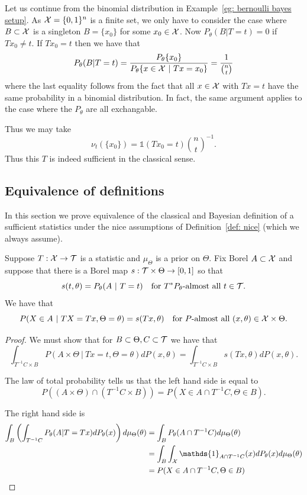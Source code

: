 \documentclass[twoside, a4paper, 10pt]{amsart}
\begin{document}
\begin{eg} Let us continue from the binomial distribution in Example~\ref{eg: bernoulli bayes setup}. As $\mathcal{X} = \{0,1\}^n$ is a finite set, we only have to consider the case where $B \subset \mathcal{X}$ is a singleton $B=\{x_0\}$ for some $x_0 \in \mathcal{X}$. Now $P_{\theta}(B | T=t) = 0$ if $Tx_0 \neq t$. If $Tx_0 = t$ then we have that $$P_{\theta}(B | T=t) = \frac{P_{\theta}\{x_0\}}{P_{\theta}\{x \in \mathcal{X} ~|~ Tx = x_0\}} = \frac{1}{\binom{n}{t}}$$ where the last equality follows from the fact that all $x \in \mathcal{X}$ with $Tx=t$ have the same probability in a binomial distribution. In fact, the same argument applies to the case where the $P_{\theta}$ are all exchangable. 

Thus we may take $$\nu_t(\{x_0\}) = \mathds{1}(Tx_0 = t) \binom{n}{t}^{-1}.$$ Thus this $T$ is indeed sufficient in the classical sense. 

\end{eg}

\subsection{Equivalence of definitions}

In this section we prove equivalence of the classical and Bayesian definition of a sufficient statistics under the nice assumptions of Definition~\ref{def: nice} (which we always assume).

\begin{lemma} Suppose $T:\mathcal{X} \to \mathcal{T}$ is a statistic and $\mu_{\Theta}$ is a prior on $\Theta$. Fix Borel $A \subset \mathcal{X}$ and suppose that there is a Borel map $s:\mathcal{T} \times \Theta \to [0,1]$ so that $$s(t,\theta) = P_{\theta}(A~|~T=t) \quad\text{for $T^*P_{\theta}$-almost all $t \in \mathcal{T}$}.$$ We have that $$P(X \in A ~|~ TX=Tx, \Theta = \theta) = s(Tx, \theta) \quad \text{for $P$-almost all $(x,\theta) \in \mathcal{X} \times \Theta$}.$$

\end{lemma}

\begin{proof} We must show that for $B\subset \Theta, C \subset \mathcal{T}$ we have that $$\int_{T^{-1}C \times B} P(A \times \Theta ~|~ Tx = t, \Theta = \theta) dP(x,\theta) = \int_{T^{-1}C \times B} s(Tx,\theta) dP(x,\theta). $$

The law of total probability tells us that the left hand side is equal to $$P((A \times \Theta) \cap  (T^{-1}C \times B) ) = P(X \in A\cap T^{-1}C, \Theta \in B).$$

The right hand side is
\begin{align*} \int_{B} \left(\int_{T^{-1}C} P_{\theta}(A | T=Tx) dP_{\theta}(x) \right) d\mu_{\Theta}(\theta) &= \int_B P_{\theta}(A \cap T^{-1}C) d\mu_{\Theta}(\theta) \\
&= \int_{B} \int_{\cX} \mathds{1}_{A \cap T^{-1}C}(x) dP_{\theta}(x) d\mu_{\Theta}(\theta) \\
&= P(X \in A\cap T^{-1}C, \Theta \in B)\end{align*} \end{proof}
\end{document}
